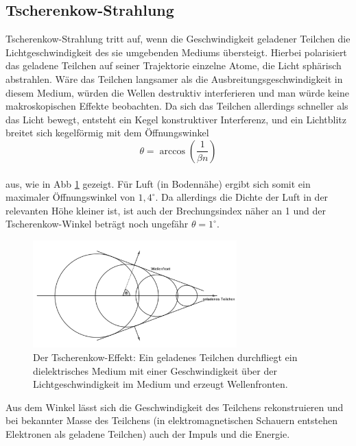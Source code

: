 \subsection{Tscherenkow-Strahlung}
Tscherenkow-Strahlung tritt auf, wenn die Geschwindigkeit geladener Teilchen die Lichtgeschwindigkeit des sie umgebenden Mediums übersteigt. Hierbei polarisiert das geladene Teilchen auf seiner Trajektorie einzelne Atome, die Licht sphärisch abstrahlen. Wäre das Teilchen langsamer als die Ausbreitungsgeschwindigkeit in diesem Medium, würden die Wellen destruktiv interferieren und man würde keine makroskopischen Effekte beobachten. Da sich das Teilchen allerdings schneller als das Licht bewegt, entsteht ein Kegel konstruktiver Interferenz, und ein Lichtblitz breitet sich kegelförmig mit dem Öffnungswinkel
\begin{equation}
\theta = \arccos\left(\frac{1}{\beta n}\right) \label{eq:cherenkow}
\end{equation}\\
aus, wie in Abb \ref{img:cherenkow} gezeigt. Für Luft (in Bodennähe) ergibt sich somit ein maximaler Öffnungswinkel von $1,4^{\circ}$\cite{Grupen}. Da allerdings die Dichte der Luft in der relevanten Höhe kleiner ist, ist auch der Brechungsindex näher an 1 und der Tscherenkow-Winkel beträgt noch ungefähr $\theta = 1^{\circ}$\cite{Grupen}.
\begin{figure}[htbp]
\centering
\includegraphics[width=0.7\textwidth]{Images/cherenkow.png}
\caption{Der Tscherenkow-Effekt: Ein geladenes Teilchen durchfliegt ein dielektrisches Medium mit einer Geschwindigkeit über der Lichtgeschwindigkeit im Medium und erzeugt Wellenfronten.}
\label{img:cherenkow}
\end{figure}
Aus dem Winkel lässt sich die Geschwindigkeit des Teilchens rekonstruieren und bei bekannter Masse des Teilchens (in elektromagnetischen Schauern entstehen Elektronen als geladene Teilchen) auch der Impuls und die Energie.

